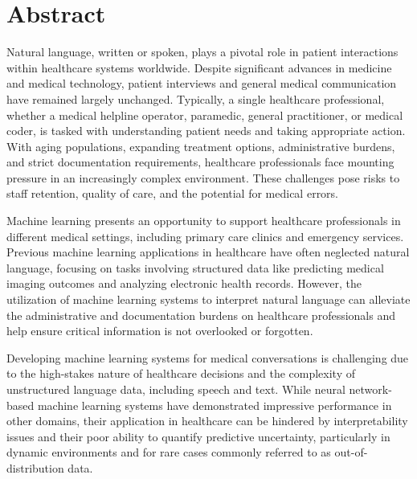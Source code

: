 
\chapter[abstract]{Abstract}

Natural language, written or spoken, plays a pivotal role in patient interactions within healthcare systems worldwide.
Despite significant advances in medicine and medical technology, patient interviews and general medical communication have remained largely unchanged. 
Typically, a single healthcare professional, whether a medical helpline operator, paramedic, general practitioner, or medical coder, is tasked with understanding patient needs and taking appropriate action. 
With aging populations, expanding treatment options, administrative burdens, and strict documentation requirements, healthcare professionals face mounting pressure in an increasingly complex environment. 
These challenges pose risks to staff retention, quality of care, and the potential for medical errors.

Machine learning presents an opportunity to support healthcare professionals in different medical settings, including primary care clinics and emergency services. Previous machine learning applications in healthcare have often neglected natural language, focusing on tasks involving structured data like predicting medical imaging outcomes and analyzing electronic health records. However, the utilization of machine learning systems to interpret natural language can alleviate the administrative and documentation burdens on healthcare professionals and help ensure critical information is not overlooked or forgotten.

Developing machine learning systems for medical conversations is challenging due to the high-stakes nature of healthcare decisions and the complexity of unstructured language data, including speech and text. While neural network-based machine learning systems have demonstrated impressive performance in other domains, their application in healthcare can be hindered by interpretability issues and their poor ability to quantify predictive uncertainty, particularly in dynamic environments and for rare cases commonly referred to as out-of-distribution data.

